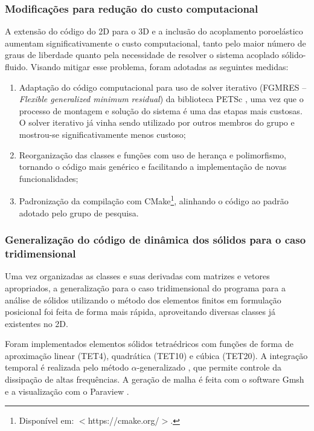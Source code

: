 \subsubsection{Modificações para redução do custo computacional}

A extensão do código do 2D para o 3D e a inclusão do acoplamento poroelástico aumentam significativamente o custo computacional, tanto pelo maior número de graus de liberdade quanto pela necessidade de resolver o sistema acoplado sólido-fluido. Visando mitigar esse problema, foram adotadas as seguintes medidas:

\begin{enumerate}
    \item Adaptação do código computacional para uso de solver iterativo (FGMRES -- \textit{Flexible generalized minimum residual}) da biblioteca PETSc \cite{petsc-web-page}, uma vez que o processo de montagem e solução do sistema é uma das etapas mais custosas. O solver iterativo já vinha sendo utilizado por outros membros do grupo e mostrou-se significativamente menos custoso;
    \item Reorganização das classes e funções com uso de herança e polimorfismo, tornando o código mais genérico e facilitando a implementação de novas funcionalidades;
    \item Padronização da compilação com CMake\footnote{Disponível em: $<$https://cmake.org/$>$.}, alinhando o código ao padrão adotado pelo grupo de pesquisa.
\end{enumerate}

\subsubsection{Generalização do código de dinâmica dos sólidos para o caso tridimensional}

Uma vez organizadas as classes e suas derivadas com matrizes e vetores apropriados, a generalização para o caso tridimensional do programa para a análise de sólidos utilizando o método dos elementos finitos em formulação posicional \cite{coda2003exact} foi feita de forma mais rápida, aproveitando diversas classes já existentes no 2D.

Foram implementados elementos sólidos tetraédricos com funções de forma de aproximação linear (TET4), quadrática (TET10) e cúbica (TET20). A integração temporal é realizada pelo método $\alpha$-generalizado \cite{chung1993time}, que permite controle da dissipação de altas frequências. A geração de malha é feita com o software Gmsh \cite{geuzaine2009gmsh} e a visualização com o Paraview \cite{ahrens2005paraview}.

